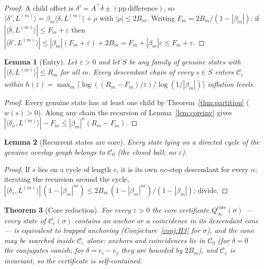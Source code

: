 \documentclass[11pt]{article}
\newtheorem{theorem}{Theorem}[section]
\newtheorem{lemma}[theorem]{Lemma}
\begin{document}
\begin{proof}
A child offset is $\delta'=A^{\!\top}\delta\pm
(\mathrm{pp\ difference})$, so
$\langle\delta',L^{(m)}\rangle=\beta_m\langle\delta,L^{(m)}\rangle+
\rho$ with $|\rho|\le2B_m$. Writing $F_m=2B_m/(1-|\beta_m|)$: if
$|\langle\delta,L^{(m)}\rangle|\le F_m+\varepsilon$ then
$|\langle\delta',L^{(m)}\rangle|\le|\beta_m|(F_m+\varepsilon)+2B_m=
F_m+|\beta_m|\varepsilon\le F_m+\varepsilon$.
\end{proof}

\begin{lemma}[Entry]\label{lem:entry}
Let $\varepsilon>0$ and let $S$ be any family of genuine states with
$|\langle\delta,L^{(m)}\rangle|\le R_m$ for all $m$. Every descendant
chain of every $s\in S$ enters $\mathcal{C}_\varepsilon$ within
$h(\varepsilon)=\max_m\lceil\log((R_m-F_m)/\varepsilon)/
\log(1/|\beta_m|)\rceil$ inflation levels.
\end{lemma}

\begin{proof}
Every genuine state has at least one child by
Theorem~\ref{thm:partition} ($w(s)>0$). Along any chain the recursion of
Lemma~\ref{lem:coreinv} gives
$|\langle\delta_n,L^{(m)}\rangle|-F_m\le|\beta_m|^n(R_m-F_m)$.
\end{proof}

\begin{lemma}[Recurrent states are core]\label{lem:reccore}
Every state lying on a directed cycle of the genuine overlap graph
belongs to $\mathcal{C}_0$ (the \emph{closed} ball; no $\varepsilon$).
\end{lemma}

\begin{proof}
If $s$ lies on a cycle of length $c$, it is its own $nc$-step
descendant for every $n$; iterating the recursion around the cycle,
$|\langle\delta_s,L^{(m)}\rangle|\,(1-|\beta_m|^{nc})\le
2B_m\,(1-|\beta_m|^{nc})/(1-|\beta_m|)$; divide.
\end{proof}

\begin{theorem}[Core reduction]\label{thm:corered}
For every $\varepsilon>0$ the \emph{core certificate}
$Q^{\mathrm{core}}_\infty(\sigma)$ --- every state of
$\mathcal{C}_\varepsilon(\sigma)$ contains an anchor or a coincidence
in its descendant cone --- is equivalent to trapped anchoring
(Conjecture~\ref{conj:H3} for $\sigma$), and the cone may be searched
inside $\mathcal{C}_\varepsilon$ alone: anchors and coincidences lie in
$\mathcal{C}_0$ (for $\delta=0$ the conjugates vanish; for
$\delta=e_i-e_j$ they are bounded by $2B_m$), and
$\mathcal{C}_\varepsilon$ is invariant, so the certificate is
self-contained.
\end{theorem}
\end{document}
